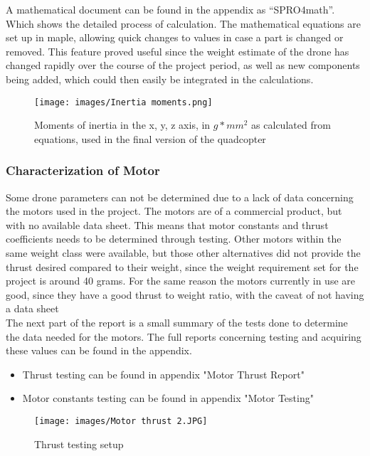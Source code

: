 \documentclass{article}
\begin{document}
A mathematical document can be found in the appendix as “SPRO4math”. Which shows the detailed process of calculation. The mathematical equations are set up in maple, allowing quick changes to values in case a part is changed or removed. This feature proved useful since the weight estimate of the drone has changed rapidly over the course of the project period, as well as new components being added, which could then easily be integrated in the calculations.\\

\begin{figure}[H]
\begin{center}
   \texttt{[image: images/Inertia moments.png]}
\end{center}
\caption{Moments of inertia in the x, y, z axis, in $g*mm^2$ as calculated from equations, used in the final version of the quadcopter}
\end{figure}

\subsubsection{Characterization of Motor}
Some drone parameters can not be determined due to a lack of data concerning the motors used in the project. The motors are of a commercial product, but with no available data sheet. This means that motor constants and thrust coefficients needs to be determined through testing. Other motors within the same weight class were available, but those other alternatives did not provide the thrust desired compared to their weight, since the weight requirement set for the project is around 40 grams. For the same reason the motors currently in use are good, since they have a good thrust to weight ratio, with the caveat of not having a data sheet\\
The next part of the report is a small summary of the tests done to determine the data needed for the motors. The full reports concerning testing and acquiring these values can be found in the appendix. 
\begin{itemize}
    \item Thrust testing can be found in appendix "Motor Thrust Report"
    \item Motor constants testing can be found in appendix "Motor Testing"
\end{itemize}

\begin{figure}[H]
\begin{center}
   \texttt{[image: images/Motor thrust 2.JPG]}
\end{center}
\caption{Thrust testing setup}
\end{figure}
\end{document}
